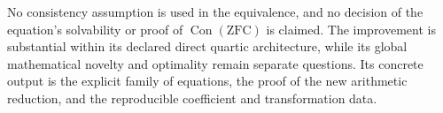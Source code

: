 No consistency assumption is used in the equivalence, and no decision
of the equation's solvability or proof of \(\operatorname{Con}(\mathrm{ZFC})\)
is claimed. The improvement is substantial within its declared
direct quartic architecture, while its global mathematical novelty
and optimality remain separate questions. Its concrete output is
the explicit family of equations, the proof of the new arithmetic
reduction, and the reproducible coefficient and transformation data.
